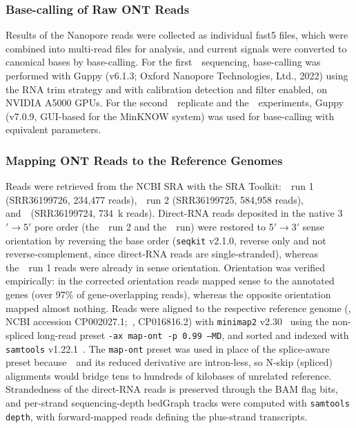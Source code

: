 \subsubsection{Base-calling of Raw ONT Reads}

Results of the Nanopore reads were collected as individual fast5 files, which were combined into multi-read files for analysis, and current signals were converted to canonical bases by base-calling.
For the first~\syn~sequencing, base-calling was performed with Guppy (v6.1.3; Oxford Nanopore Technologies, Ltd., 2022) using the RNA trim strategy and with calibration detection and filter enabled, on NVIDIA A5000 GPUs.
For the second~\syn~replicate and the~\syna~experiments, Guppy (v7.0.9, GUI-based for the MinKNOW system) was used for base-calling with equivalent parameters.

\subsubsection{Mapping ONT Reads to the Reference Genomes}

Reads were retrieved from the NCBI SRA with the SRA Toolkit:~\syn~run 1 (SRR36199726, 234{,}477 reads),~\syn~run 2 (SRR36199725, 584{,}958 reads), and~\syna~(SRR36199724, 734~k reads).
Direct-RNA reads deposited in the native 3$'\rightarrow$5$'$ pore order (the~\syn~run 2 and the~\syna~run) were restored to 5$'\rightarrow$3$'$ sense orientation by reversing the base order (\texttt{seqkit} v2.1.0, reverse only and not reverse-complement, since direct-RNA reads are single-stranded), whereas the~\syn~run 1 reads were already in sense orientation.
Orientation was verified empirically: in the corrected orientation reads mapped sense to the annotated genes (over 97\% of gene-overlapping reads), whereas the opposite orientation mapped almost nothing.
Reads were aligned to the respective reference genome (\jsyn, NCBI accession CP002027.1;~\jsyna, CP016816.2) with \texttt{minimap2} v2.30~\cite{li_minimap2_2018} using the non-spliced long-read preset \texttt{-ax map-ont -p 0.99 --MD}, and sorted and indexed with \texttt{samtools} v1.22.1~\cite{li_sequence_2009}.
The \texttt{map-ont} preset was used in place of the splice-aware preset because~\mmy~and its reduced derivative are intron-less, so N-skip (spliced) alignments would bridge tens to hundreds of kilobases of unrelated reference.
Strandedness of the direct-RNA reads is preserved through the BAM flag bits, and per-strand sequencing-depth bedGraph tracks were computed with \texttt{samtools depth}, with forward-mapped reads defining the plus-strand transcripts.

